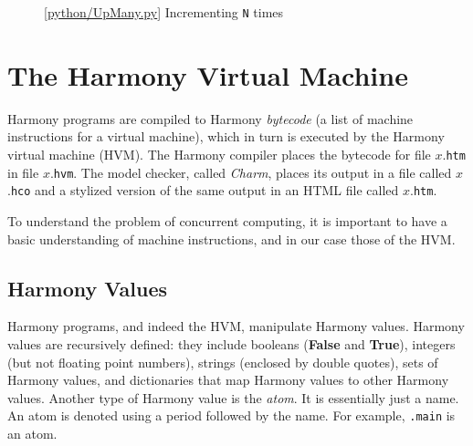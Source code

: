 \documentclass{report}
\newcommand{\harmonylink}[1]{%
[\href{https://harmony.cs.cornell.edu/#1}{\underline{#1}}]%
}
\newenvironment{code}{
\tcolorbox
}{
\endtcolorbox
}
\begin{document}
\begin{figure}
\begin{code}
\end{code}
\caption{\harmonylink{python/UpMany.py} Incrementing \texttt{N} times}
\label{fig:incmany}
\end{figure}

\chapter{The Harmony Virtual Machine}
\label{ch:harmonymachine}
%

Harmony programs are compiled to Harmony \emph{bytecode}
%
(a list of machine instructions for a virtual machine),
which in turn is executed by the Harmony virtual machine (HVM).
%
%
%
The Harmony compiler places the bytecode for file $x$.\texttt{htm} in
file $x$.\texttt{hvm}.
The model checker, called \emph{Charm}, places its output in a file
called $x$.\texttt{hco} and a stylized version of the same output
in an HTML file called $x$.\texttt{htm}.

To understand the problem of concurrent computing, it
is important to have a basic understanding of machine instructions,
and in our case those of the HVM.

\section*{Harmony Values}

Harmony programs, and indeed the HVM,  manipulate Harmony values.
Harmony values are recursively defined:
they include booleans (\textbf{False} and \textbf{True}),
integers (but not floating point numbers),
strings (enclosed by double quotes),
sets of Harmony values,
and dictionaries
%
that map Harmony values to other Harmony values.
%
Another type of Harmony value is the \emph{atom}.
%
It is essentially
just a name.  An atom is denoted using a period followed by the
name.  For example, \texttt{.main} is an atom.
\end{document}
